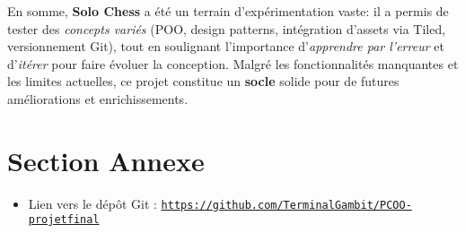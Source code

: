 \documentclass[11pt,a4paper]{article}
\begin{document}
En somme, \textbf{Solo Chess} a été un terrain d’expérimentation vaste: il a permis de tester des \emph{concepts variés} (POO, design patterns, intégration d’assets via Tiled, versionnement Git), tout en soulignant l’importance d’\emph{apprendre par l’erreur} et d’\emph{itérer} pour faire évoluer la conception. Malgré les fonctionnalités manquantes et les limites actuelles, ce projet constitue un \textbf{socle} solide pour de futures améliorations et enrichissements.

\section*{Section Annexe}
\begin{itemize}[leftmargin=1.5em]
    \item Lien vers le dépôt Git : \href{https://github.com/TerminalGambit/PCOO-projetfinal}{\texttt{https://github.com/TerminalGambit/PCOO-projetfinal}}
\end{itemize}
\end{document}
